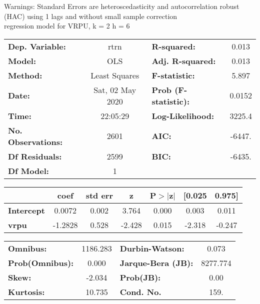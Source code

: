 Warnings: \newline
 [1] Standard Errors are heteroscedasticity and autocorrelation robust (HAC) using 1 lags and without small sample correction\\ 

regression model for VRPU, k = 2 h = 6\begin{center}
\begin{tabular}{lclc}
\toprule
\textbf{Dep. Variable:}    &       rtrn       & \textbf{  R-squared:         } &     0.013   \\
\textbf{Model:}            &       OLS        & \textbf{  Adj. R-squared:    } &     0.013   \\
\textbf{Method:}           &  Least Squares   & \textbf{  F-statistic:       } &     5.897   \\
\textbf{Date:}             & Sat, 02 May 2020 & \textbf{  Prob (F-statistic):} &   0.0152    \\
\textbf{Time:}             &     22:05:29     & \textbf{  Log-Likelihood:    } &    3225.4   \\
\textbf{No. Observations:} &        2601      & \textbf{  AIC:               } &    -6447.   \\
\textbf{Df Residuals:}     &        2599      & \textbf{  BIC:               } &    -6435.   \\
\textbf{Df Model:}         &           1      & \textbf{                     } &             \\
\bottomrule
\end{tabular}
\begin{tabular}{lcccccc}
                   & \textbf{coef} & \textbf{std err} & \textbf{z} & \textbf{P$> |$z$|$} & \textbf{[0.025} & \textbf{0.975]}  \\
\midrule
\textbf{Intercept} &       0.0072  &        0.002     &     3.764  &         0.000        &        0.003    &        0.011     \\
\textbf{vrpu}      &      -1.2828  &        0.528     &    -2.428  &         0.015        &       -2.318    &       -0.247     \\
\bottomrule
\end{tabular}
\begin{tabular}{lclc}
\textbf{Omnibus:}       & 1186.283 & \textbf{  Durbin-Watson:     } &    0.073  \\
\textbf{Prob(Omnibus):} &   0.000  & \textbf{  Jarque-Bera (JB):  } & 8277.774  \\
\textbf{Skew:}          &  -2.034  & \textbf{  Prob(JB):          } &     0.00  \\
\textbf{Kurtosis:}      &  10.735  & \textbf{  Cond. No.          } &     159.  \\
\bottomrule
\end{tabular}
\end{center}

